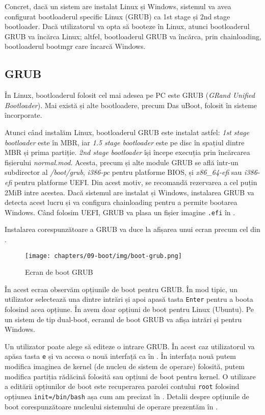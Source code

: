 Concret, dacă un sistem are instalat Linux și Windows, sistemul va avea configurat
bootloaderul specific Linux (GRUB) ca 1st stage și 2nd stage bootloader. Dacă
utilizatorul va opta să booteze în Linux, atunci bootloaderul GRUB va încărca
Linux; altfel, bootloaderul GRUB va încărca, prin chainloading, bootloaderul
bootmgr care încarcă Windows.

\subsection{GRUB}
\label{sec:boot:bootloader:grub}

În Linux, bootloaderul folosit cel mai adesea pe PC este GRUB (\textit{GRand Unified
Bootloader}). Mai există și alte bootloadere, precum Das uBoot, folosit în
sisteme încorporate.

Atunci când instalăm Linux, bootloaderul GRUB este instalat astfel: \textit{1st
stage bootloader} este în MBR, iar \textit{1.5 stage bootloader} este pe disc în spațiul dintre MBR și prima partiție.
\textit{2nd stage bootloader} își începe execuția prin încărcarea fișierului \textit{normal.mod}.
Acesta, precum și alte module GRUB se află într-un subdirector al \textit{/boot/grub}, \textit{i386-pc} pentru
platforme BIOS, și \textit{x86_64-efi} sau \textit{i386-efi} pentru platforme UEFI.
Din acest motiv, se recomandă rezervarea a cel puțin 2MiB intre acestea.
Dacă sistemul are instalat și Windows, instalarea GRUB va
detecta acest lucru și va configura chainloading pentru a permite bootarea
Windows. Când folosim UEFI, GRUB va plasa un fișier imagine \texttt{.efi} în
.

Instalarea corespunzătoare a GRUB va duce la afișarea unui ecran precum cel din .

\begin{figure}[!htbp]
  \centering
  \texttt{[image: chapters/09-boot/img/boot-grub.png]}
  \caption{Ecran de boot GRUB}
  \label{fig:boot:boot-grub}
\end{figure}

În acest ecran observăm opțiunile de boot pentru GRUB. În mod tipic, un
utilizator selectează una dintre intrări și apoi apasă tasta \texttt{Enter} pentru a
boota folosind acea opțiune. În  avem doar opțiuni de boot pentru Linux (Ubuntu). Pe un sistem de tip dual-boot, ecranul de boot GRUB va afișa intrări și pentru Windows.

Un utilizator poate alege să editeze o intrare GRUB. În acest caz utilizatorul
va apăsa tasta \texttt{e} și va accesa o nouă interfață ca în .
În interfața nouă putem modifica imaginea de kernel (de nucleu de sistem de operare)
folosită, putem modifica partiția rădăcină folosită sau opțiuni de boot pentru
kernel. O utilizare a editării opțiunilor de boot este recuperarea parolei
contului \texttt{root} folosind opțiunea \texttt{init=/bin/bash} așa cum am precizat în
. Detalii despre
opțiunile de boot corespunzătoare nucleului sistemului de operare prezentăm în
.

